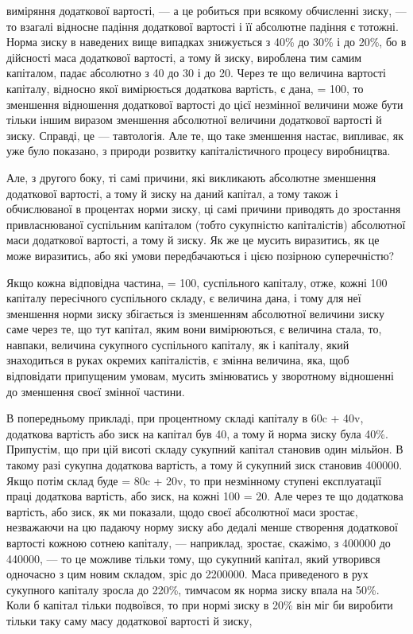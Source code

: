 \parcont{}  %
виміряння додаткової вартості, — а це робиться при всякому
обчисленні зиску, — то взагалі відносне падіння додаткової вартості
і її абсолютне падіння є тотожні. Норма зиску в наведених
вище випадках знижується з 40\% до 30\% і до 20\%, бо в дійсності
маса додаткової вартості, а тому й зиску, вироблена тим
самим капіталом, падає абсолютно з 40 до 30 і до 20. Через те
що величина вартості капіталу, відносно якої вимірюється додаткова
вартість, є дана, = 100, то зменшення відношення додаткової
вартості до цієї незмінної величини може бути тільки іншим
виразом зменшення абсолютної величини додаткової вартості
й зиску. Справді, це — тавтологія. Але те, що таке зменшення
настає, випливає, як уже було показано, з природи розвитку
капіталістичного процесу виробництва.

Але, з другого боку, ті самі причини, які викликають абсолютне
зменшення додаткової вартості, а тому й зиску на даний
капітал, а тому також і обчислюваної в процентах норми зиску,
ці самі причини приводять до зростання привласнюваної суспільним
капіталом (тобто сукупністю капіталістів) абсолютної маси
додаткової вартості, а тому й зиску. Як же це мусить виразитись,
як це може виразитись, або які умови передбачаються
і цією позірною суперечністю?

Якщо кожна відповідна частина, = 100, суспільного капіталу,
отже, кожні 100 капіталу пересічного суспільного складу, є величина
дана, і тому для неї зменшення норми зиску збігається
із зменшенням абсолютної величини зиску саме через те, що
тут капітал, яким вони вимірюються, є величина стала, то,
навпаки, величина сукупного суспільного капіталу, як і капіталу,
який знаходиться в руках окремих капіталістів, є змінна
величина, яка, щоб відповідати припущеним умовам, мусить
змінюватись у зворотному відношенні до зменшення своєї змінної
частини.

В попередньому прикладі, при процентному складі капіталу
в 60c + 40v, додаткова вартість або зиск на капітал був 40,
а тому й норма зиску була 40\%. Припустім, що при цій висоті
складу сукупний капітал становив один мільйон. В такому разі
сукупна додаткова вартість, а тому й сукупний зиск становив
400000. Якщо потім склад буде = 80c + 20v, то при незмінному
ступені експлуатації праці додаткова вартість, або зиск, на кожні
100 = 20. Але через те що додаткова вартість, або зиск, як ми
показали, щодо своєї абсолютної маси зростає, незважаючи на цю
падаючу норму зиску або дедалі менше створення додаткової
вартості кожною сотнею капіталу, — наприклад, зростає, скажімо,
з 400000 до 440000, — то це можливе тільки тому, що сукупний
капітал, який утворився одночасно з цим новим складом, зріс
до 2200000. Маса приведеного в рух сукупного капіталу зросла
до 220\%, тимчасом як норма зиску впала на 50\%. Коли б капітал
тільки подвоївся, то при нормі зиску в 20\% він міг би
виробити тільки таку саму масу додаткової вартості й зиску,
\parbreak{}  %

